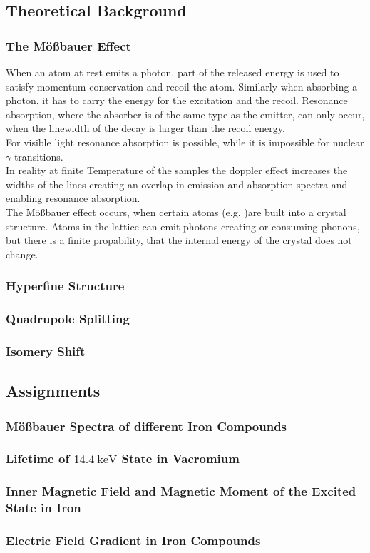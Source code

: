 
\subsection{Theoretical Background}

\subsubsection{The Mößbauer Effect}
When an atom at rest emits a photon, part of the released energy is used to satisfy momentum conservation and recoil the atom.
Similarly when absorbing a photon, it has to carry the energy for the excitation and the recoil.
Resonance absorption, where the absorber is of the same type as the emitter, can only occur, when the linewidth of the decay is larger than the recoil energy.\\

For visible light resonance absorption is possible, while it is impossible for nuclear $\gamma$-transitions.\\

In reality at finite Temperature of the samples the doppler effect increases the widths of the lines creating an overlap in emission and absorption spectra and enabling resonance absorption.\\

The Mößbauer effect occurs, when certain atoms (e.g. )are built into a crystal structure. Atoms in the lattice can emit photons creating or consuming phonons, but there is a finite propability, that the internal energy of the crystal does not change.


\subsubsection{Hyperfine Structure}

\subsubsection{Quadrupole Splitting}

\subsubsection{Isomery Shift}

\subsection{Assignments}

\subsubsection{Mößbauer Spectra of different Iron Compounds}

\subsubsection{Lifetime of $14.4 \ \text{keV}$ State in Vacromium}

\subsubsection{Inner Magnetic Field and Magnetic Moment of the Excited State in Iron}

\subsubsection{Electric Field Gradient in Iron Compounds}
